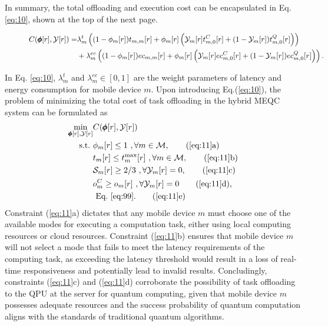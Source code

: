 \documentclass[journal]{IEEEtran}
\begin{document}
In summary, the total offloading and execution cost can be encapsulated in Eq. \eqref{eq:10}, shown at the top of the next page.
\begin{figure}
\begin{align}\label{eq:10}
    C(\pmb{\phi}[r],\mathcal{Y}[r])=&\lambda_m^t\left((1-\mathcal{\phi}_m[r])t_{m,m}[r]+\mathcal{\phi}_m[r]\left(\mathcal{Y}_{m}[r]t_{m,0}^C[r]+(1-\mathcal{Y}_{m}[r])t_{m,0}^Q[r]\right)\right)\notag\\
    &+\lambda_m^{ec}\left((1-\mathcal{\phi}_m[r])ec_{m,m}[r]+\mathcal{\phi}_m[r]\left(\mathcal{Y}_{m}[r]ec_{m,0}^C[r]+(1-\mathcal{Y}_{m}[r])ec_{m,0}^Q[r]\right)\right).
\end{align}
\hrulefill
\end{figure}
In Eq. \eqref{eq:10}, $\lambda_m^t$ and $\lambda_m^{ec} \in [0,1]$ are the weight parameters of latency and energy consumption for mobile device $m$.
Upon introducing Eq.(\ref{eq:10}), the problem of minimizing the total cost of task offloading in the hybrid MEQC system can be formulated as
\begin{align}
    \min_{\pmb{\phi}[r],\mathcal{Y}[r]}& C(\pmb{\phi}[r],\mathcal{Y}[r])\label{eq:11}\\
\text{s.t.~} &\mathcal{\phi}_m[r]\le 1 ~ ,\forall m \in \mathcal{M},\tag{\ref{eq:11}a}\\
    &t_m[r] \le t_m^{\max}[r] ~ ,\forall m \in \mathcal{M},\tag{\ref{eq:11}b}\\
    &\mathcal{S}_m[r]\ge 2/3 ~ ,\forall \mathcal{Y}_m[r]=0, \tag{\ref{eq:11}c}\\
    &o_m^C\ge o_m[r] ~ ,\forall \mathcal{Y}_m[r]=0\tag{\ref{eq:11}d},\\
    &\text{~Eq.~}\eqref{eq:99}.\tag{\ref{eq:11}e}
\end{align}
Constraint (\ref{eq:11}a) dictates that any mobile device $m$ must choose one of the available modes for executing a computation task, either using local computing resources or cloud resources.
Constraint (\ref{eq:11}b) ensures that mobile device $m$ will not select a mode that fails to meet the latency requirements of the computing task, as exceeding the latency threshold would result in a loss of real-time responsiveness and potentially lead to invalid results.
Concludingly, constraints (\ref{eq:11}c) and (\ref{eq:11}d) corroborate the possibility of task offloading to the QPU at the server for quantum computing, given that mobile device $m$ possesses adequate resources and the success probability of quantum computation aligns with the standards of traditional quantum algorithms.
\end{document}
